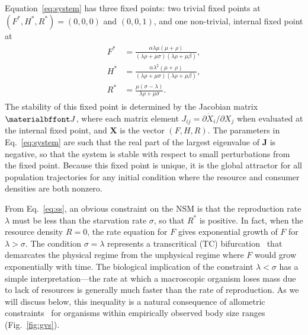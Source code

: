 \documentclass{pnastwo}
\begin{document}
\begin{article}
Equation~\eqref{eq:system} has three fixed points: two trivial fixed points
at $(F^*,H^*,R^*)=(0,0,0)$ and $(0,0,1)$, and one non-trivial, internal
fixed point at
\begin{align}
\label{eq:ss}
\begin{split}
F^* &= \frac{\alpha  \lambda  \mu  (\mu +\rho )}{(\lambda  \rho +\mu  \sigma ) (\lambda  \rho +\mu  \beta)}, \\
H^* &= \frac{\alpha  \lambda ^2 (\mu +\rho )}{(\lambda  \rho +\mu  \sigma ) (\lambda  \rho +\mu  \beta)}, \\
R^* &= \frac{\mu  (\sigma -\lambda )}{\lambda  \rho +\mu  \sigma }.
\end{split}
\end{align}
The stability of this fixed point is determined by the Jacobian matrix
$\bf J$, where each matrix element $J_{ij}=\partial{\dot X_i}/\partial{X_j}$
when evaluated at the internal fixed point, and $\mathbf{X}$ is the vector
$(F,H,R)$.  The parameters in Eq.~\eqref{eq:system} are such that the real
part of the largest eigenvalue of $\mathbf{J}$ is negative, so that the
system is stable with respect to small perturbations from the fixed point.
Because this fixed point is unique, it is the global attractor for all
population trajectories for any initial condition where the resource and
consumer densities are both nonzero.

From Eq.~\eqref{eq:ss}, an obvious constraint on the NSM is that the
reproduction rate $\lambda$ must be less than the starvation rate $\sigma$,
so that $R^*$ is positive.  In fact, when the resource density $R=0$, the
rate equation for $F$ gives exponential growth of $F$ for $\lambda>\sigma$.
The condition $\sigma = \lambda$ represents a transcritical (TC)
bifurcation~\cite{Strogatz:2014} that demarcates the physical regime from the
unphysical regime where $F$ would grow exponentially with time.  The
biological implication of the constraint $\lambda<\sigma$ has a simple
interpretation---the rate at which a macroscopic organism loses mass due to
lack of resources is generally much faster than the rate of reproduction.  As
we will discuss below, this inequality is a natural consequence of allometric
constraints~\cite{Kempes:2012hy} for organisms within empirically observed
body size ranges (Fig.~\ref{fig:gvs}).


\end{article}
\end{document}
